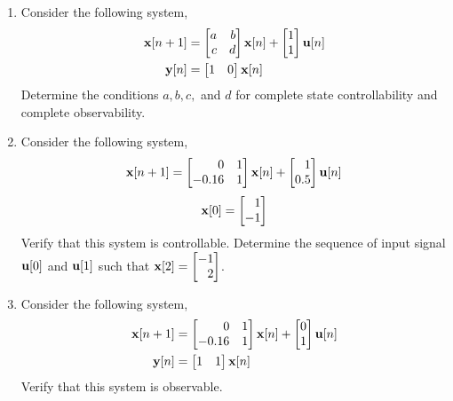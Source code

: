 \documentclass[9pt]{article}
\def\mf{\ensuremath\mathbf}
\def\bmx{\ensuremath\begin{bmatrix*}[r]}
\def\emx{\ensuremath\end{bmatrix*}}
\begin{document}
\begin{multicols}{2}
\begin{enumerate}[resume]
\begin{center}
    \end{center}

    \item Consider the following system,
    \[ \begin{split}
        \mf{x}[n + 1] &= \bmx a & b \\ c & d\emx \mf{x}[n] + \bmx 1 \\ 1\emx \mf{u}[n] \\
        \mf{y}[n] &= \bmx 1 & 0\emx \mf{x}[n]
       \end{split} \]
    Determine the conditions $a, b, c, $ and $d$ for complete state controllability and complete observability.

    \item Consider the following system,
    \[ \mf{x}[n + 1] = \bmx 0 & 1 \\ -0.16 & 1\emx \mf{x}[n] + \bmx 1 \\ 0.5\emx \mf{u}[n] \]
    \[ \mf{x}[0] = \bmx 1 \\ -1\emx \]
    Verify that this system is controllable. Determine the sequence of input signal $\mf{u}[0]$ and $\mf{u}[1]$ such that $\mf{x}[2] = \bmx -1 \\ 2 \emx$.

    \item Consider the following system,
    \[ \begin{split}
        \mf{x}[n + 1] &= \bmx 0 & 1 \\ -0.16 & 1\emx \mf{x}[n] + \bmx 0 \\ 1\emx \mf{u}[n] \\
        \mf{y}[n] &= \bmx 1 & 1\emx \mf{x}[n]
        \end{split} \]
    Verify that this system is observable.
    \newpage
\end{enumerate}

\end{multicols}
\end{document}
